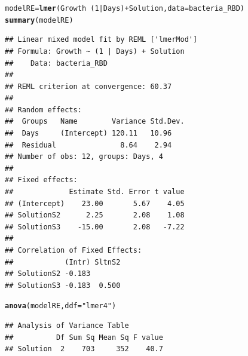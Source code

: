 \documentclass[a4paper]{article}\usepackage{graphicx, color}
\makeatletter
\newcommand{\hlfunctioncall}[1]{\textcolor[rgb]{0.501960784313725,0,0.329411764705882}{\textbf{#1}}}%
\newcommand{\hlstring}[1]{\textcolor[rgb]{0.6,0.6,1}{#1}}%
\newenvironment{kframe}{%
 \def\at@end@of@kframe{}%
 \ifinner\ifhmode%
  \def\at@end@of@kframe{\end{minipage}}%
  \begin{minipage}{\columnwidth}%
 \fi\fi%
 \def\FrameCommand##1{\hskip\@totalleftmargin \hskip-\fboxsep
 \colorbox{shadecolor}{##1}\hskip-\fboxsep
     \hskip-\linewidth \hskip-\@totalleftmargin \hskip\columnwidth}%
 \MakeFramed {\advance\hsize-\width
   \@totalleftmargin\z@ \linewidth\hsize
   \@setminipage}}%
 {\par\unskip\endMakeFramed%
 \at@end@of@kframe}
\newenvironment{knitrout}{}{} %
\makeatother
\begin{document}
\begin{knitrout}
\begin{kframe}
\begin{alltt}
modelRE = \hlfunctioncall{lmer}(Growth ~ (1 | Days) + Solution, data = bacteria_RBD)
\hlfunctioncall{summary}(modelRE)
\end{alltt}
\begin{verbatim}
## Linear mixed model fit by REML ['lmerMod']
## Formula: Growth ~ (1 | Days) + Solution 
##    Data: bacteria_RBD 
## 
## REML criterion at convergence: 60.37 
## 
## Random effects:
##  Groups   Name        Variance Std.Dev.
##  Days     (Intercept) 120.11   10.96   
##  Residual               8.64    2.94   
## Number of obs: 12, groups: Days, 4
## 
## Fixed effects:
##             Estimate Std. Error t value
## (Intercept)    23.00       5.67    4.05
## SolutionS2      2.25       2.08    1.08
## SolutionS3    -15.00       2.08   -7.22
## 
## Correlation of Fixed Effects:
##            (Intr) SltnS2
## SolutionS2 -0.183       
## SolutionS3 -0.183  0.500
\end{verbatim}
\begin{alltt}
\hlfunctioncall{anova}(modelRE, ddf = \hlstring{"lmer4"})
\end{alltt}
\begin{verbatim}
## Analysis of Variance Table
##          Df Sum Sq Mean Sq F value
## Solution  2    703     352    40.7
\end{verbatim}
\begin{alltt}


\end{alltt}
\end{kframe}
\end{knitrout}
\end{document}
